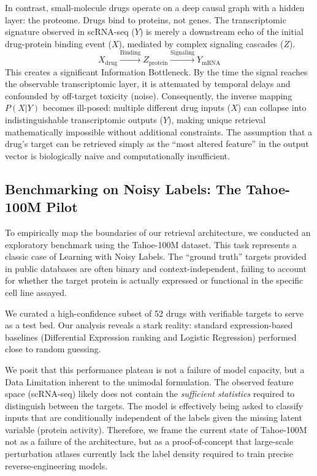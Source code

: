 \documentclass[conference]{IEEEtran}
\begin{document}
In contrast, small-molecule drugs operate on a deep causal graph with a hidden layer: the proteome. Drugs bind to proteins, not genes. The transcriptomic signature observed in scRNA-seq ($Y$) is merely a downstream echo of the initial drug-protein binding event ($X$), mediated by complex signaling cascades ($Z$).
\[
X_{\text{drug}} \xrightarrow{\text{Binding}} Z_{\text{protein}} \xrightarrow{\text{Signaling}} Y_{\text{mRNA}}
\]
This creates a significant Information Bottleneck. By the time the signal reaches the observable transcriptomic layer, it is attenuated by temporal delays and confounded by off-target toxicity (noise). Consequently, the inverse mapping $P(X|Y)$ becomes ill-posed: multiple different drug inputs ($X$) can collapse into indistinguishable transcriptomic outputs ($Y$), making unique retrieval mathematically impossible without additional constraints. The assumption that a drug's target can be retrieved simply as the ``most altered feature'' in the output vector is biologically naive and computationally insufficient.

\subsection{Benchmarking on Noisy Labels: The Tahoe-100M Pilot}
To empirically map the boundaries of our retrieval architecture, we conducted an exploratory benchmark using the Tahoe-100M dataset. This task represents a classic case of Learning with Noisy Labels. The ``ground truth'' targets provided in public databases are often binary and context-independent, failing to account for whether the target protein is actually expressed or functional in the specific cell line assayed.

We curated a high-confidence subset of 52 drugs with verifiable targets to serve as a test bed. Our analysis reveals a stark reality: standard expression-based baselines (Differential Expression ranking and Logistic Regression) performed close to random guessing.

We posit that this performance plateau is not a failure of model capacity, but a Data Limitation inherent to the unimodal formulation. The observed feature space (scRNA-seq) likely does not contain the \textit{sufficient statistics} required to distinguish between the targets. The model is effectively being asked to classify inputs that are conditionally independent of the labels given the missing latent variable (protein activity). Therefore, we frame the current state of Tahoe-100M not as a failure of the architecture, but as a proof-of-concept that large-scale perturbation atlases currently lack the label density required to train precise reverse-engineering models.
\end{document}
